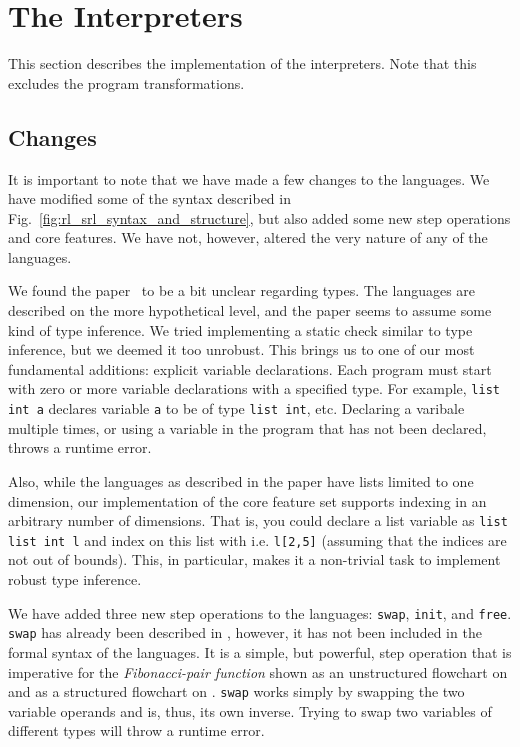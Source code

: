 
\section{The Interpreters}

This section describes the implementation of the interpreters. Note that this excludes the program transformations.

\subsection{Changes}\label{sec:changes}

It is important to note that we have made a few changes to the languages. We have modified some of the syntax described in Fig.~\ref{fig:rl_srl_syntax_and_structure}, but also added some new step operations and core features. We have not, however, altered the very nature of any of the languages.

We found the paper~\cite{REV} to be a bit unclear regarding types. The languages are described on the more hypothetical level, and the paper seems to assume some kind of type inference. We tried implementing a static check similar to type inference, but we deemed it too unrobust. This brings us to one of our most fundamental additions: explicit variable declarations. Each program must start with zero or more variable declarations with a specified type. For example, \texttt{list int a} declares variable \texttt{a} to be of type \texttt{list int}, etc. Declaring a varibale multiple times, or using a variable in the program that has not been declared, throws a runtime error.

Also, while the languages as described in the paper have lists limited to one dimension, our implementation of the core feature set supports indexing in an arbitrary number of dimensions. That is, you could declare a list variable as \texttt{list list int l} and index on this list with i.e. \texttt{l[2,5]} (assuming that the indices are not out of bounds). This, in particular, makes it a non-trivial task to implement robust type inference.

We have added three new step operations to the languages: \texttt{swap}, \texttt{init}, and \texttt{free}. \texttt{swap} has already been described in \cite[p.~99]{REV}, however, it has not been included in the formal syntax of the languages. It is a simple, but powerful, step operation that is imperative for the \textit{Fibonacci-pair function} shown as an unstructured flowchart on \cite[p.~99]{REV} and as a structured flowchart on \cite[p.~93]{REV}. \texttt{swap} works simply by swapping the two variable operands and is, thus, its own inverse. Trying to swap two variables of different types will throw a runtime error.

